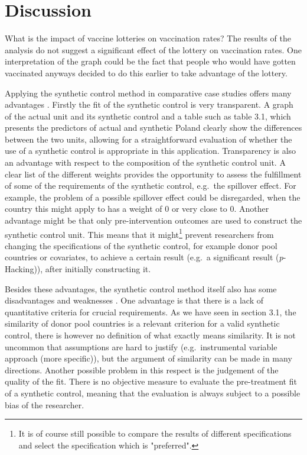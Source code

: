 \documentclass{scrbook}
\begin{document}
\chapter{Discussion}

What is the impact of vaccine lotteries on vaccination rates? The
results of the analysis do not suggest a significant effect of the
lottery on vaccination rates. One interpretation of the graph could be
the fact that people who would have gotten vaccinated anyways decided to
do this earlier to take advantage of the lottery.

Applying the synthetic control method in comparative case studies offers
many advantages \parencite{abadie_using_2021}. Firstly the fit of the
synthetic control is very transparent. A graph of the actual unit and
its synthetic control and a table such as table 3.1, which presents the
predictors of actual and synthetic Poland clearly show the differences
between the two units, allowing for a straightforward evaluation of
whether the use of a synthetic control is appropriate in this
application. Transparency is also an advantage with respect to the
composition of the synthetic control unit. A clear list of the different
weights provides the opportunity to assess the fulfillment of some of
the requirements of the synthetic control, e.g.~the spillover effect.
For example, the problem of a possible spillover effect could be
disregarded, when the country this might apply to has a weight of 0 or
very close to 0. Another advantage might be that only pre-intervention
outcomes are used to construct the synthetic control unit. This means
that it
might\footnote{It is of course still possible to compare the results of different specifications and select the specification which is "preferred".}
prevent researchers from changing the specifications of the synthetic
control, for example donor pool countries or covariates, to achieve a
certain result (e.g.~a significant result (\textit{p}-Hacking)), after
initially constructing it.

Besides these advantages, the synthetic control method itself also has
some disadvantages and weaknesses \parencite{bouttell_synthetic_2018}.
One advantage is that there is a lack of quantitative criteria for
crucial requirements. As we have seen in section 3.1, the similarity of
donor pool countries is a relevant criterion for a valid synthetic
control, there is however no definition of what exactly means
similarity. It is not uncommon that assumptions are hard to justify
(e.g.~instrumental variable approach (more specific)), but the argument
of similarity can be made in many directions. Another possible problem
in this respect is the judgement of the quality of the fit. There is no
objective measure to evaluate the pre-treatment fit of a synthetic
control, meaning that the evaluation is always subject to a possible
bias of the researcher.
\end{document}
